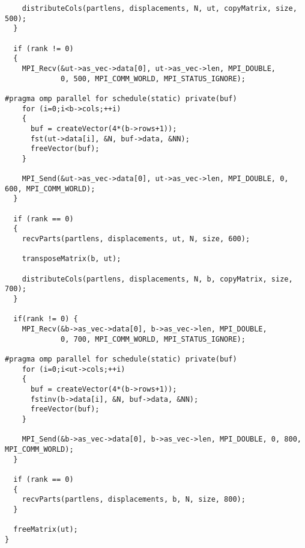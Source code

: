 \begin{lstlisting}
    distributeCols(partlens, displacements, N, ut, copyMatrix, size, 500);
  }

  if (rank != 0)
  {
    MPI_Recv(&ut->as_vec->data[0], ut->as_vec->len, MPI_DOUBLE,
             0, 500, MPI_COMM_WORLD, MPI_STATUS_IGNORE);

#pragma omp parallel for schedule(static) private(buf)
    for (i=0;i<b->cols;++i)
    {
      buf = createVector(4*(b->rows+1));
      fst(ut->data[i], &N, buf->data, &NN);
      freeVector(buf);
    }

    MPI_Send(&ut->as_vec->data[0], ut->as_vec->len, MPI_DOUBLE, 0, 600, MPI_COMM_WORLD);
  }

  if (rank == 0)
  {
    recvParts(partlens, displacements, ut, N, size, 600);

    transposeMatrix(b, ut);

    distributeCols(partlens, displacements, N, b, copyMatrix, size, 700);
  }

  if(rank != 0) {
    MPI_Recv(&b->as_vec->data[0], b->as_vec->len, MPI_DOUBLE,
             0, 700, MPI_COMM_WORLD, MPI_STATUS_IGNORE);

#pragma omp parallel for schedule(static) private(buf)
    for (i=0;i<ut->cols;++i)
    {
      buf = createVector(4*(b->rows+1));
      fstinv(b->data[i], &N, buf->data, &NN);
      freeVector(buf);
    }

    MPI_Send(&b->as_vec->data[0], b->as_vec->len, MPI_DOUBLE, 0, 800, MPI_COMM_WORLD);
  }

  if (rank == 0)
  {
    recvParts(partlens, displacements, b, N, size, 800);
  }

  freeMatrix(ut);
}
\end{lstlisting}


